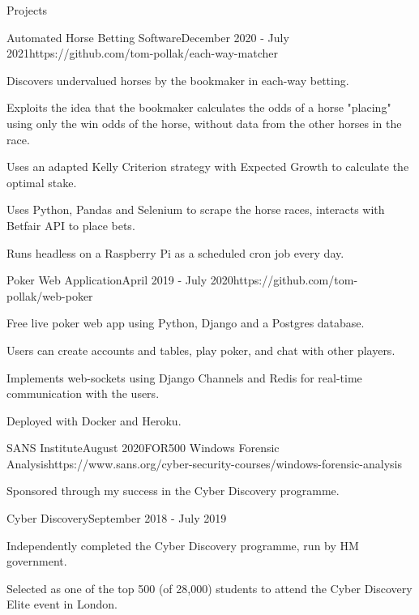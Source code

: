 \documentclass{structure}
\begin{document}
\begin{rSection}{Projects}

\begin{rSubsection}{Automated Horse Betting Software}{December 2020 - July 2021}{}{}{https://github.com/tom-pollak/each-way-matcher}
    \item Discovers undervalued horses by the bookmaker in each-way betting.
    \item Exploits the idea that the bookmaker calculates the odds of a horse
    "placing" using only the win odds of the horse, without data from the
    other horses in the race.
    \item Uses an adapted Kelly Criterion strategy with Expected Growth to calculate
    the optimal stake.
    \item Uses Python, Pandas and Selenium to scrape the horse races, interacts with
    Betfair API to place bets.
    \item Runs headless on a Raspberry Pi as a scheduled cron job every day.
\end{rSubsection}

\begin{rSubsection}{Poker Web Application}{April 2019 - July 2020}{}{}{https://github.com/tom-pollak/web-poker}
    \item Free live poker web app using Python, Django and a Postgres database.
    \item Users can create accounts and tables, play poker, and chat with other players.
    \item Implements web-sockets using Django Channels and Redis for real-time communication with the users.
    \item Deployed with Docker and Heroku.
\end{rSubsection}

\begin{rSubsection}{SANS Institute}{August 2020}{FOR500 Windows Forensic Analysis}{}{https://www.sans.org/cyber-security-courses/windows-forensic-analysis}
    \item Sponsored through my success in the Cyber Discovery programme.
\end{rSubsection}

\begin{rSubsection}{Cyber Discovery}{September 2018 - July 2019}{}{}{}
    \item Independently completed the Cyber Discovery programme, run by HM government.
    \item Selected as one of the top 500 (of 28,000) students to attend the Cyber Discovery Elite event in London.
\end{rSubsection}

\end{rSection}
\end{document}
